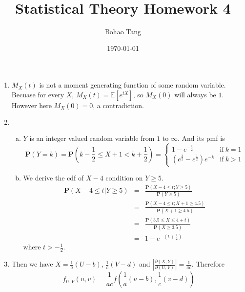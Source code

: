 \documentclass[12pt]{article}
\title{Statistical Theory Homework 4}
\date{\today}
\author{Bohao Tang}
\newcommand{\prob}[1]{\textbf{P}(#1)}
\begin{document}

\maketitle

\begin{enumerate}
    \item $M_X(t)$ is not a moment generating function of some random variable. 
    Becuase for every $X$, $M_X(t) = \mathbb{E}[e^{tX}]$, so $M_X(0)$ will always be $1$. However here $M_X(0) = 0$, a contradiction.

    \item 
    \begin{enumerate}[(a)]
        \item
        $Y$ is an integer valued random variable from $1$ to $\infty$. And its pmf is 
        $$\textbf{P}(Y = k) = \textbf{P}(k-\frac{1}{2} \le X+1 < k+\frac{1}{2}) = 
            \begin{cases}
                1 - e^{-\frac{1}{2}} & \text{if}\ k = 1\\
                (e^{\frac{3}{2}} - e^{\frac{1}{2}})e^{-k} & \text{if}\ k > 1
            \end{cases} $$

        \item
        We derive the cdf of $X - 4$ condition on $Y \ge 5$.
        \begin{eqnarray}
             \prob{X - 4 \le t | Y \ge 5} &=& \frac{\prob{X - 4 \le t ; Y \ge 5}}{\prob{Y \ge 5}} \\
                                          &=& \frac{\prob{X - 4 \le t ; X + 1 \ge 4.5}}{\prob{X + 1 \ge 4.5}} \\             
                                          &=& \frac{\prob{3.5 \le X \le 4 + t}}{\prob{X \ge 3.5}} \\
                                          &=& 1 - e^{-(t + \frac{1}{2})}
        \end{eqnarray}
        where $t > -\frac{1}{2}$.
    \end{enumerate}

    \item
    Then we have $X = \frac{1}{a} (U - b)$, $\frac{1}{c} (V - d)$ and $|\frac{\partial (X, Y)}{\partial (U, V)}| = \frac{1}{ac}$.
    Therefore 
    $$f_{U,V}(u,v) = \frac{1}{ac} f(\frac{1}{a} (u - b) , \frac{1}{c} (v - d))$$


\end{enumerate}
\end{document}
